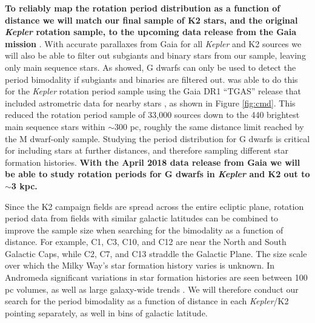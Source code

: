 \documentclass[12pt]{article}
\newcommand{\Kepler}{\textsl{Kepler}\xspace}
\begin{document}
{\bf To reliably map the rotation period distribution as a function of distance we will match our final sample of K2 stars, and the original \Kepler rotation sample, to the upcoming data release from the Gaia mission} \citep{perryman2001}. With accurate parallaxes from Gaia for all \Kepler and K2 sources we will also be able to filter out subgiants and binary stars from our sample, leaving only main sequence stars. As \citet{davenport2017} showed, G dwarfs can only be used to detect the period bimodality if subgiants and binaries are filtered out.\citet{davenport2017} was able to do this for the \Kepler rotation period sample using the Gaia DR1 ``TGAS'' release that included astrometric data for nearby stars \citep{gaia_dr1}, as shown in Figure \ref{fig:cmd}. This reduced the \citet{mcquillan2014} rotation period sample of 33,000 sources down to the 440 brightest main sequence stars within $\sim$300 pc, roughly the same distance limit reached by the M dwarf-only sample. Studying the period distribution for G dwarfs is critical for including stars at further distances, and therefore sampling different star formation histories. {\bf With the April 2018 data release from Gaia we will be able to study rotation periods for G dwarfs in \Kepler and K2 out to $\sim$3 kpc.}





Since the K2 campaign fields are spread across the entire ecliptic plane, rotation period data from fields with similar galactic latitudes can be combined to improve the sample size when searching for the bimodality as a function of distance. For example, C1, C3, C10, and C12 are near the North and South Galactic Caps, while C2, C7, and C13 straddle the Galactic Plane. The size scale over which the Milky Way's star formation history varies is unknown. In Andromeda significant variations in star formation histories are seen between 100 pc volumes, as well as large galaxy-wide trends \citep[e.g.][]{lewis2015}. We will therefore conduct our search for the period bimodality as a function of distance in each \Kepler/K2 pointing separately, as well in bins of galactic latitude.
\end{document}
